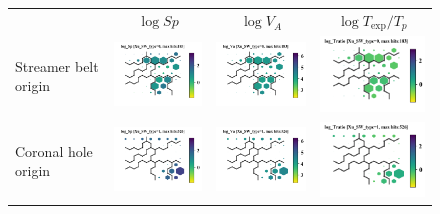 \documentclass[border=0pt,varwidth=20cm,convert={outext=.jpg,density=300}]{standalone}%
\begin{document}
\begin{figure}[h!]
\begin{tabular}{m{2.5cm}CCC}
		& $\log Sp$ & $\log V_{A}$ & $\log T_{\text{exp}}/T_p$ \\
		Streamer belt origin & \includegraphics[width=4cm]{Roberts/SWtype-Xu_SW_type-0-log_Sp} &
		\includegraphics[width=4cm]{Roberts/SWtype-Xu_SW_type-0-log_Va} &
		\includegraphics[width=4cm]{Roberts/SWtype-Xu_SW_type-0-log_Tratio} \hfill	\\
		
		Coronal hole origin & \includegraphics[width=4cm]{Roberts/SWtype-Xu_SW_type-1-log_Sp} &
		\includegraphics[width=4cm]{Roberts/SWtype-Xu_SW_type-1-log_Va} &
		\includegraphics[width=4cm]{Roberts/SWtype-Xu_SW_type-1-log_Tratio} \hfill	\\
		

\end{tabular}
\end{figure}
\end{document}
